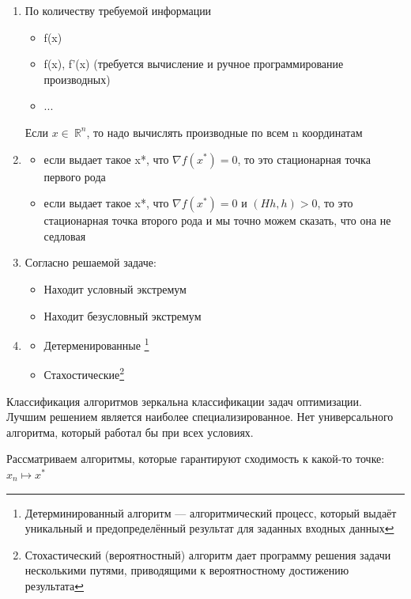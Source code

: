 \documentclass[a4paper, 12pt]{article}
\begin{document}
	
	\begin{enumerate}
		\item По количеству требуемой информации
		\begin{itemize}
			\item f(x) 
			\item f(x), f'(x) (требуется вычисление и ручное программирование производных)
			\item ...	
		\end{itemize}
		Если $x \in\ \mathbb {R}^n$, то надо вычислять производные по всем n координатам
		\item \begin{itemize}
			
			\item  если выдает такое x*, что  $\nabla f(x^*) = 0$, то это стационарная точка первого рода    
			\item если выдает такое x*, что  $\nabla f(x^*) = 0$ и $(Hh, h) > 0$, то это стационарная точка второго рода и мы точно можем сказать, что она не седловая
			
		\end{itemize}
		\item Согласно решаемой задаче:
		\begin{itemize}
			\item Находит условный экстремум
			\item Находит безусловный экстремум
		\end{itemize}
		\item 
		\begin{itemize}
			\item Детерменированные \footnote{Детерминированный алгоритм — алгоритмический процесс, который выдаёт уникальный и предопределённый результат для заданных входных данных}
			\item Стахостические\footnote{Стохастический (вероятностный) алгоритм дает программу решения задачи несколькими путями, приводящими к вероятностному достижению результата} 
		\end{itemize}
	\end{enumerate}
	
	Классификация алгоритмов зеркальна классификации задач оптимизации.
	Лучшим решением является наиболее специализированное. Нет универсального алгоритма, который работал бы при всех условиях.
	
	Рассматриваем алгоритмы, которые гарантируют сходимость к какой-то точке: $x_n \mapsto x^*$
	
\end{document}
